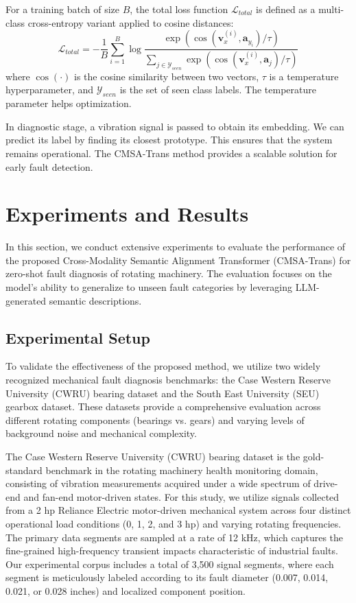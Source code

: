\documentclass[journal]{IEEEtran}
\begin{document}
For a training batch of size $B$, the total loss function $\mathcal{L}_{total}$ is defined as a multi-class cross-entropy variant applied to cosine distances:
\begin{equation}
\mathcal{L}_{total} = -\frac{1}{B} \sum_{i=1}^{B} \log \frac{\exp(\cos(\mathbf{v}_x^{(i)}, \mathbf{a}_{y_i}) / \tau)}{\sum_{j \in \mathcal{Y}_{seen}} \exp(\cos(\mathbf{v}_x^{(i)}, \mathbf{a}_j) / \tau)}
\end{equation}
where $\cos(\cdot)$ is the cosine similarity between two vectors, $\tau$ is a temperature hyperparameter, and $\mathcal{Y}_{seen}$ is the set of seen class labels. The temperature parameter helps optimization.

In diagnostic stage, a vibration signal is passed to obtain its embedding. We can predict its label by finding its closest prototype. This ensures that the system remains operational. The CMSA-Trans method provides a scalable solution for early fault detection.


\section{Experiments and Results}
In this section, we conduct extensive experiments to evaluate the performance of the proposed Cross-Modality Semantic Alignment Transformer (CMSA-Trans) for zero-shot fault diagnosis of rotating machinery. The evaluation focuses on the model's ability to generalize to unseen fault categories by leveraging LLM-generated semantic descriptions.

\subsection{Experimental Setup}
To validate the effectiveness of the proposed method, we utilize two widely recognized mechanical fault diagnosis benchmarks: the Case Western Reserve University (CWRU) bearing dataset and the South East University (SEU) gearbox dataset. These datasets provide a comprehensive evaluation across different rotating components (bearings vs. gears) and varying levels of background noise and mechanical complexity.

The Case Western Reserve University (CWRU) bearing dataset is the gold-standard benchmark in the rotating machinery health monitoring domain, consisting of vibration measurements acquired under a wide spectrum of drive-end and fan-end motor-driven states. For this study, we utilize signals collected from a 2 hp Reliance Electric motor-driven mechanical system across four distinct operational load conditions (0, 1, 2, and 3 hp) and varying rotating frequencies. The primary data segments are sampled at a rate of 12 kHz, which captures the fine-grained high-frequency transient impacts characteristic of industrial faults. Our experimental corpus includes a total of 3,500 signal segments, where each segment is meticulously labeled according to its fault diameter (0.007, 0.014, 0.021, or 0.028 inches) and localized component position. 
\end{document}
